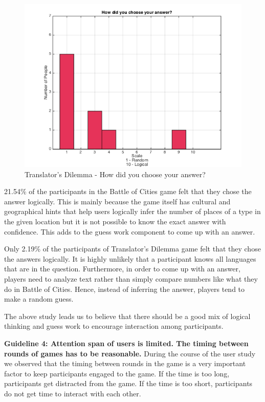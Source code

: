 \documentclass{sig-alternate}
\begin{document}
\begin{figure}
	\includegraphics[width=\linewidth]{t_random_logical.png}
	\caption{Translator's Dilemma - How did you choose your answer?}
	\label{fig:t_random_logical}
\end{figure}

21.54\% of the participants in the Battle of Cities game felt that they chose the answer logically. This is mainly because the game itself has cultural and geographical hints that help users logically infer the number of places of a type in the given location but it is not possible to know the exact answer with confidence. This adds to the guess work component to come up with an answer.

Only 2.19\% of the participants of Translator's Dilemma game felt that they chose the answers logically. It is highly unlikely that a participant knows all languages that are in the question. Furthermore, in order to come up with an answer, players need to analyze text rather than simply compare numbers like what they do in Battle of Cities. Hence, instead of inferring the answer, players tend to make a random guess.

The above study leads us to believe that there should be a good mix of logical thinking and guess work to encourage interaction among participants. 

\textbf{Guideline 4: Attention span of users is limited. The timing between rounds of games has to be reasonable.}
During the course of the user study we observed that the timing between rounds in the game is a very important factor to keep participants engaged to the game. If the time is too long, participants get distracted from the game. If the time is too short, participants do not get time to interact with each other. 
\end{document}
